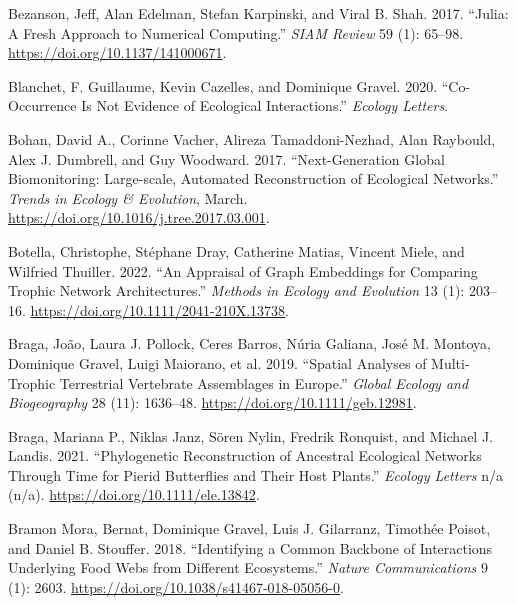 \documentclass[
  letterpaper,
  DIV=11,
  numbers=noendperiod]{scrartcl}
\newlength{\cslhangindent}
\newlength{\cslentryspacingunit} %
\newenvironment{CSLReferences}[2] %
 {%
  \setlength{\parindent}{0pt}
  \ifodd #1
  \let\oldpar\par
  \def\par{\hangindent=\cslhangindent\oldpar}
  \fi
  \setlength{\parskip}{#2\cslentryspacingunit}
 }%
 {}
\begin{document}
\begin{CSLReferences}{1}{0}
\leavevmode{}%
Bezanson, Jeff, Alan Edelman, Stefan Karpinski, and Viral B. Shah. 2017.
{``Julia: {A Fresh Approach} to {Numerical Computing}.''} \emph{SIAM
Review} 59 (1): 65--98. \url{https://doi.org/10.1137/141000671}.

\leavevmode{}%
Blanchet, F. Guillaume, Kevin Cazelles, and Dominique Gravel. 2020.
{``Co-Occurrence Is Not Evidence of Ecological Interactions.''}
\emph{Ecology Letters}.

\leavevmode{}%
Bohan, David A., Corinne Vacher, Alireza Tamaddoni-Nezhad, Alan
Raybould, Alex J. Dumbrell, and Guy Woodward. 2017. {``Next-{Generation
Global Biomonitoring}: {Large-scale}, {Automated Reconstruction} of
{Ecological Networks}.''} \emph{Trends in Ecology \& Evolution}, March.
\url{https://doi.org/10.1016/j.tree.2017.03.001}.

\leavevmode{}%
Botella, Christophe, Stéphane Dray, Catherine Matias, Vincent Miele, and
Wilfried Thuiller. 2022. {``An Appraisal of Graph Embeddings for
Comparing Trophic Network Architectures.''} \emph{Methods in Ecology and
Evolution} 13 (1): 203--16.
\url{https://doi.org/10.1111/2041-210X.13738}.

\leavevmode{}%
Braga, João, Laura J. Pollock, Ceres Barros, Núria Galiana, José M.
Montoya, Dominique Gravel, Luigi Maiorano, et al. 2019. {``Spatial
Analyses of Multi-Trophic Terrestrial Vertebrate Assemblages in
{Europe}.''} \emph{Global Ecology and Biogeography} 28 (11): 1636--48.
\url{https://doi.org/10.1111/geb.12981}.

\leavevmode{}%
Braga, Mariana P., Niklas Janz, Sören Nylin, Fredrik Ronquist, and
Michael J. Landis. 2021. {``Phylogenetic Reconstruction of Ancestral
Ecological Networks Through Time for Pierid Butterflies and Their Host
Plants.''} \emph{Ecology Letters} n/a (n/a).
\url{https://doi.org/10.1111/ele.13842}.

\leavevmode{}%
Bramon Mora, Bernat, Dominique Gravel, Luis J. Gilarranz, Timothée
Poisot, and Daniel B. Stouffer. 2018. {``Identifying a Common Backbone
of Interactions Underlying Food Webs from Different Ecosystems.''}
\emph{Nature Communications} 9 (1): 2603.
\url{https://doi.org/10.1038/s41467-018-05056-0}.


\end{CSLReferences}
\end{document}
